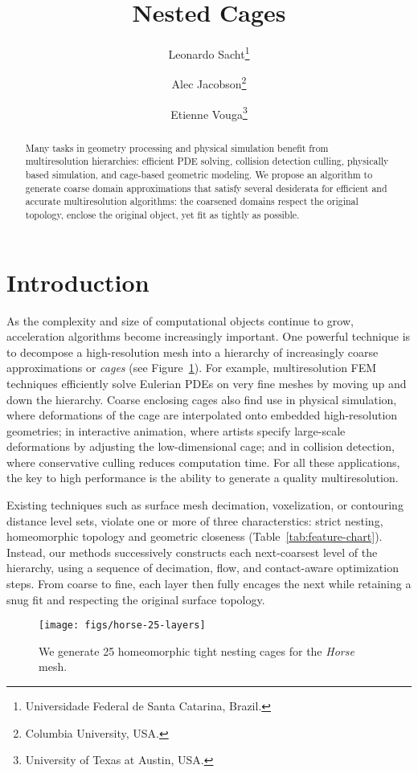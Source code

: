 \documentclass{cgyrf15}
\title{Nested Cages}
\author{
Leonardo Sacht\thanks{Universidade Federal de Santa Catarina, Brazil.} \and
Alec Jacobson\thanks{Columbia University, USA.} \and
Etienne Vouga\thanks{University of Texas at Austin, USA.} 
}
\begin{document}
\maketitle

\begin{abstract}
Many tasks in geometry processing and physical simulation benefit from multiresolution hierarchies: efficient PDE solving, collision detection culling, physically based simulation, and cage-based geometric modeling. We propose an algorithm to generate coarse domain approximations that satisfy several desiderata for efficient and accurate multiresolution algorithms: the coarsened domains respect the original topology, enclose the original object, yet fit as tightly as possible.
\end{abstract}

\section{Introduction}

As the complexity and size of computational objects continue to grow,
acceleration algorithms become increasingly important. One powerful technique
is to decompose a high-resolution mesh into a hierarchy of increasingly coarse
approximations or \emph{cages} (see Figure~\ref{fig:horse}). For example,
multiresolution FEM techniques efficiently solve Eulerian PDEs on very fine
meshes by moving up and down the hierarchy.
Coarse enclosing cages also find use in physical simulation,
where deformations of the cage are interpolated onto embedded high-resolution
geometries; in interactive animation, where artists specify large-scale
deformations by adjusting the low-dimensional cage; and in collision detection,
where conservative culling reduces computation time. For all these
applications, the key to high performance is the ability to generate a quality
multiresolution.

Existing techniques such as surface mesh decimation, voxelization, 
or contouring distance level sets, violate one or more of three characterstics: 
strict nesting, homeomorphic topology and geometric closeness
(Table~\ref{tab:feature-chart}). 
Instead, our methods successively constructs each next-coarsest 
level of the hierarchy, using a sequence of decimation, flow, 
and contact-aware optimization steps. 
From coarse to fine, each layer then fully encages the next while retaining a 
snug fit and respecting the original surface topology.

\begin{figure}[t]
  \texttt{[image: figs/horse-25-layers]}
  \caption{We generate 25 homeomorphic tight nesting cages 
  for the \emph{Horse} mesh.}
  \label{fig:horse}
\end{figure}
\end{document}
